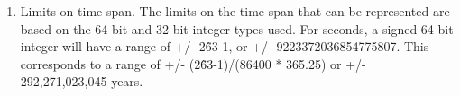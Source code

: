 
\begin{enumerate}

\item {Limits on time span.} The limits on the time span that can be represented are 
based on the
64-bit and 32-bit integer types used.  For seconds, a signed 64-bit integer
will have a range of +/- 2\^63-1, or +/- 9223372036854775807.  This corresponds
to a range of +/- (2\^63-1)/(86400 * 365.25) or +/- 292,271,023,045 years.

\end{enumerate}



